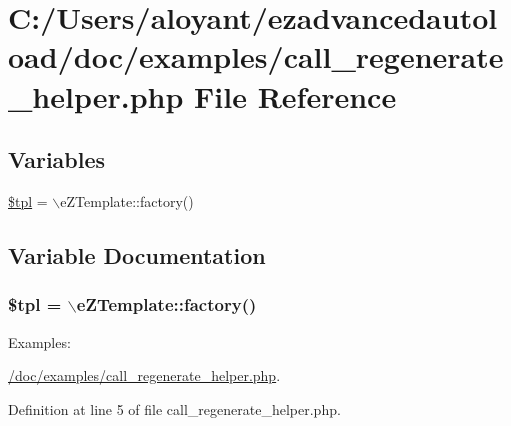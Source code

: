 \hypertarget{call__regenerate__helper_8php}{\section{C\-:/\-Users/aloyant/ezadvancedautoload/doc/examples/call\-\_\-regenerate\-\_\-helper.php File Reference}
\label{call__regenerate__helper_8php}
}
\subsection*{Variables}
\begin{DoxyCompactItemize}
\item 
\hyperlink{call__regenerate__helper_8php_a04b1944cdb09f9a4e290cde7a12499e6}{\$tpl} = $\backslash$e\-Z\-Template\-::factory()
\end{DoxyCompactItemize}


\subsection{Variable Documentation}
\hypertarget{call__regenerate__helper_8php_a04b1944cdb09f9a4e290cde7a12499e6}{
\subsubsection[{\$tpl}]{\setlength{\rightskip}{0pt plus 5cm}\$tpl = $\backslash$e\-Z\-Template\-::factory()}}\label{call__regenerate__helper_8php_a04b1944cdb09f9a4e290cde7a12499e6}
\begin{Desc}
\item[Examples\-: ]\par
\hyperlink{_2doc_2examples_2call_regenerate_helper_8php-example}{/doc/examples/call\-\_\-regenerate\-\_\-helper.\-php}.\end{Desc}


Definition at line 5 of file call\-\_\-regenerate\-\_\-helper.\-php.

